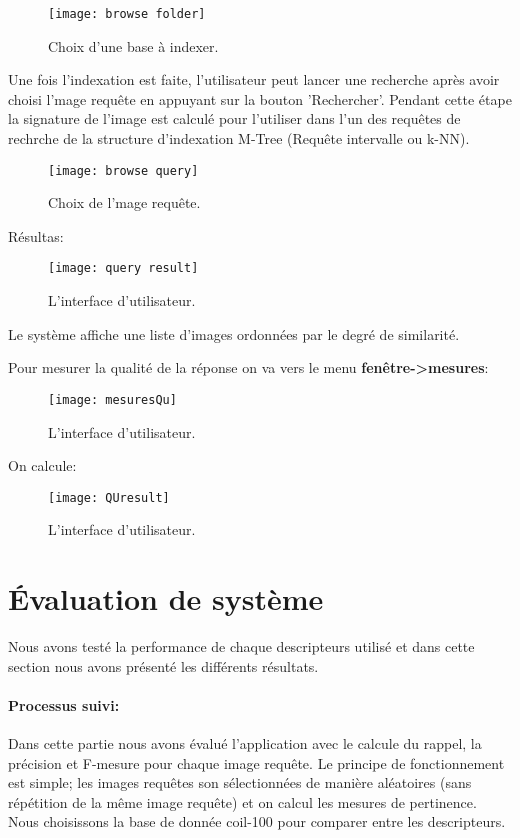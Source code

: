 \begin{figure}[H]
	\centering
	\texttt{[image: browse folder]} 
	\caption{Choix d'une base à indexer.}
\end{figure}

Une fois l'indexation est faite, l’utilisateur peut lancer une recherche après avoir choisi l'mage requête en appuyant sur la bouton 'Rechercher'. Pendant cette étape la signature de l’image est calculé pour l'utiliser dans l'un des requêtes de rechrche de la structure d'indexation M-Tree (Requête intervalle ou k-NN).\\

\begin{figure}[H]
	\centering
	\texttt{[image: browse query]} 
	\caption{Choix de l'mage requête.}
\end{figure}
Résultas:
\begin{figure}[H]
	\centering
	\texttt{[image: query result]} 
	\caption{L'interface d’utilisateur.}
\end{figure}

Le système affiche une liste d'images ordonnées par le degré de similarité.

Pour mesurer la qualité de la réponse on va vers le menu \textbf{fenêtre->mesures}:
\begin{figure}[H]
	\centering
	\texttt{[image: mesuresQu]} 
	\caption{L'interface d’utilisateur.}
\end{figure}
On calcule:
\begin{figure}[H]
	\centering
	\texttt{[image: QUresult]} 
	\caption{L'interface d’utilisateur.}
\end{figure}

\section{Évaluation de système}
Nous avons testé la performance de chaque descripteurs utilisé et dans cette section nous avons présenté les différents résultats.

\paragraph{Processus suivi:}
Dans cette partie nous avons évalué l’application avec le calcule du rappel, la précision et F-mesure pour chaque image requête. Le principe de fonctionnement est simple; les images requêtes son sélectionnées de manière aléatoires (sans répétition de la même image requête) et on calcul les mesures de pertinence. Nous choisissons la base de donnée coil-100 pour comparer entre les descripteurs. 
